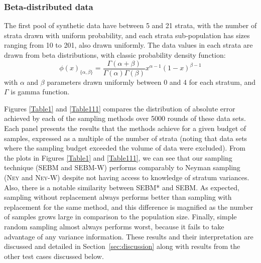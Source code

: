 \subsubsection{Beta-distributed data}\label{sec:beta_distributed_data}
The first pool of synthetic data %
have between 5 and 21 strata, with the number of strata drawn with uniform probability, 
and each strata sub-population has sizes ranging from 10 to 201, also drawn uniformly.
The data values in each strata are drawn from beta distributions, with classic probability density function:
$$\phi(x)_{\{\alpha,\beta\}}
=\frac{\Gamma(\alpha+\beta)}{\Gamma(\alpha)\Gamma(\beta)}     
    x^{\alpha-1}(1-x)^{\beta-1} $$
with $\alpha$ and $\beta$ parameters drawn uniformly between 0 and 4 for each stratum, and $\Gamma$ is gamma function.








Figures \ref{Table1} and \ref{Table111} compares the distribution of absolute error achieved by each of the sampling methods over 5000 rounds of these data sets.
Each panel presents the results that the methods achieve for a given budget of samples, 
expressed as a multiple of the number of strata (noting that data sets where the sampling budget exceeded the volume of data were excluded).
From the plots in Figures \ref{Table1} and \ref{Table111}, we can see that our sampling technique (SEBM and SEBM-W) performs comparably to
Neyman sampling (\textsc{Ney} and \textsc{Ney-W}) despite not having access to knowledge of stratum variances.
Also, there is a notable similarity between SEBM* and SEBM.
As expected, sampling without replacement always performs better than sampling with replacement for the same method, and this difference is magnified as the number of samples grows large in comparison to the population size. 
Finally, simple random sampling almost always performs worst, because it fails to take advantage of any variance information.
These results and their interpretation are discussed and detailed in Section~\ref{sec:discussion} along with results from the other test cases discussed below.



